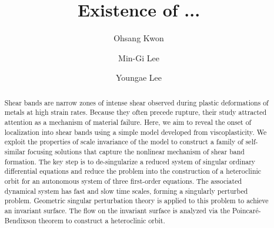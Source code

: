 \documentclass[a4paper,11pt]{article}
\numberwithin{step}{dummy}
\begin{document}
\title{Existence of ...}
\author{Ohsang Kwon\footnotemark[1]\and  Min-Gi Lee\footnotemark[2]
\and Youngae Lee\footnotemark[3]}
\date{}

\maketitle
\renewcommand{\thefootnote}{\fnsymbol{footnote}}

\renewcommand{\thefootnote}{\arabic{footnote}}


\begin{abstract}
Shear bands are narrow zones of intense shear observed during  plastic deformations of metals at high strain rates. Because they often precede rupture, 
their study attracted attention as a mechanism of material failure.  
Here, we aim to reveal the onset of localization into shear bands using a simple model developed from viscoplasticity.
We  exploit the properties of scale invariance of the model to construct a family of self-similar focusing solutions that capture 
the nonlinear mechanism of  shear band formation. The key step is to de-singularize a reduced  system of singular ordinary differential equations 
and reduce the problem into the construction of a heteroclinic orbit for an autonomous system  of three first-order equations. 
The associated  dynamical system has  fast and slow time scales, forming a singularly perturbed problem.  
Geometric singular perturbation theory is applied to this problem to achieve an invariant surface. The flow on
the invariant surface  is analyzed via the Poincar\'{e}-Bendixson theorem to construct a heteroclinic orbit. 
\end{abstract}

% 
\end{document}
